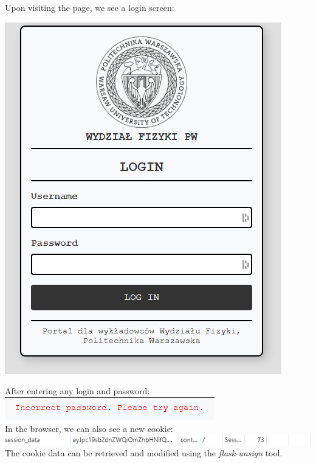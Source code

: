 \documentclass{article}
\begin{document}
Upon visiting the page, we see a login screen:
\vspace{3mm}
\begin{paracol}{2}
    \begin{center}
        \includegraphics[width=0.9\linewidth]{"image12.jpeg"}
    \end{center}
    \switchcolumn
    After entering any login and password:
    \vspace{3mm} \\
    \includegraphics[width=0.9\linewidth]{"image13.png"} \\
    In the browser, we can also see a new cookie: \\
    \includegraphics[width=0.9\linewidth]{"image14.png"} \\
    The cookie data can be retrieved and modified using the \textit{flask-unsign} tool.
\end{paracol}
\end{document}
